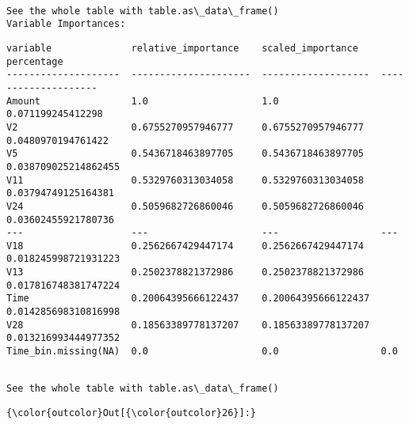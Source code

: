 \documentclass[11pt]{article}
\begin{document}
    
    \begin{Verbatim}[commandchars=\\\{\}]

See the whole table with table.as\_data\_frame()
Variable Importances: 

    \end{Verbatim}

    
    \begin{verbatim}
variable              relative_importance    scaled_importance    percentage
--------------------  ---------------------  -------------------  --------------------
Amount                1.0                    1.0                  0.071199245412298
V2                    0.6755270957946777     0.6755270957946777   0.0480970194761422
V5                    0.5436718463897705     0.5436718463897705   0.038709025214862455
V11                   0.5329760313034058     0.5329760313034058   0.03794749125164381
V24                   0.5059682726860046     0.5059682726860046   0.03602455921780736
---                   ---                    ---                  ---
V18                   0.2562667429447174     0.2562667429447174   0.018245998721931223
V13                   0.2502378821372986     0.2502378821372986   0.017816748381747224
Time                  0.20064395666122437    0.20064395666122437  0.014285698310816998
V28                   0.18563389778137207    0.18563389778137207  0.013216993444977352
Time_bin.missing(NA)  0.0                    0.0                  0.0
    \end{verbatim}

    
    \begin{Verbatim}[commandchars=\\\{\}]

See the whole table with table.as\_data\_frame()

    \end{Verbatim}

\begin{Verbatim}[commandchars=\\\{\}]
{\color{outcolor}Out[{\color{outcolor}26}]:} 
\end{Verbatim}
            
\end{document}
